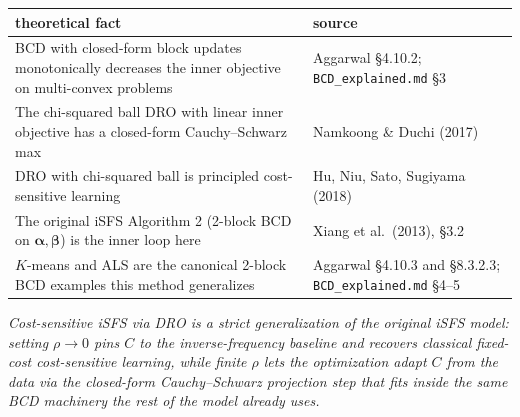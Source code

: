 \documentclass[11pt,a4paper]{article}
\begin{document}
\bigskip

\begin{center}
\small
\begin{tabular}{ll}
\toprule
\textbf{theoretical fact} & \textbf{source} \\
\midrule
BCD with closed-form block updates monotonically decreases the inner objective on multi-convex problems & Aggarwal \S 4.10.2; \texttt{BCD\_explained.md} \S 3 \\
The chi-squared ball DRO with linear inner objective has a closed-form Cauchy--Schwarz max & Namkoong \& Duchi (2017) \\
DRO with chi-squared ball is principled cost-sensitive learning & Hu, Niu, Sato, Sugiyama (2018) \\
The original iSFS Algorithm 2 (2-block BCD on $\boldsymbol{\alpha}, \boldsymbol{\beta}$) is the inner loop here & Xiang et al.\ (2013), \S 3.2 \\
$K$-means and ALS are the canonical 2-block BCD examples this method generalizes & Aggarwal \S 4.10.3 and \S 8.3.2.3; \texttt{BCD\_explained.md} \S 4--5 \\
\bottomrule
\end{tabular}
\end{center}

\bigskip

\begin{center}
\emph{Cost-sensitive iSFS via DRO is a strict generalization of the original iSFS model: setting $\rho \to 0$ pins $C$ to the inverse-frequency baseline and recovers classical fixed-cost cost-sensitive learning, while finite $\rho$ lets the optimization adapt $C$ from the data via the closed-form Cauchy--Schwarz projection step that fits inside the same BCD machinery the rest of the model already uses.}
\end{center}
\end{document}
